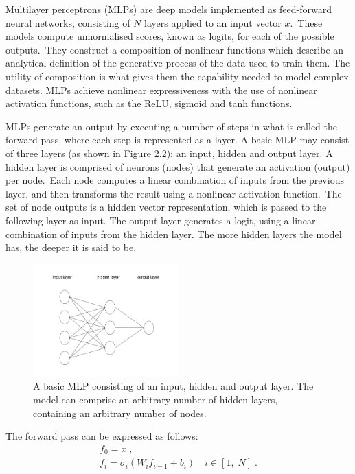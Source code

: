 \noindent Multilayer perceptrons (MLPs) are deep models implemented as feed-forward neural networks, consisting of $N$ layers applied to an input vector $ x $.\ These models compute unnormalised scores, known as logits, for each of the possible outputs.\ They construct a composition of nonlinear functions which describe an analytical definition of the generative process of the data used to train them. The utility of composition is what gives them the capability needed to model complex datasets. MLPs achieve nonlinear expressiveness with the use of nonlinear activation functions, such as the ReLU, sigmoid and tanh functions.  \par

\noindent MLPs generate an output by executing a number of steps in what is called the forward pass, where each step is represented as a layer. A basic MLP may consist of three layers (as shown in Figure 2.2): an input, hidden and output layer. A hidden layer is comprised of neurons (nodes) that generate an activation (output) per node.\ Each node computes a linear combination of inputs from the previous layer, and then transforms the result using a nonlinear activation function.\ The set of node outputs is a hidden vector representation, which is passed to the following layer as input. The output layer generates a logit, using a linear combination of inputs from the hidden layer. The more hidden layers the model has, the deeper it is said to be.

\begin{figure}
   	\centering
    	\includegraphics[width=0.5\textwidth, height=0.3\textwidth]{multilayer_perceptron}
	\caption{A basic MLP consisting of an input, hidden and output layer. The model can comprise an arbitrary number of hidden layers, containing an arbitrary number of nodes.}
\end{figure}

\noindent The forward pass can be expressed as follows:
\begin{subequations}
	\begin{gather}
		f_0 = x \; , \\
		f_i=\sigma_i(W_{i}f_{i - 1} + b_{i}) \quad i \in [1, \; N] \; .
	\end{gather}
\end{subequations}

